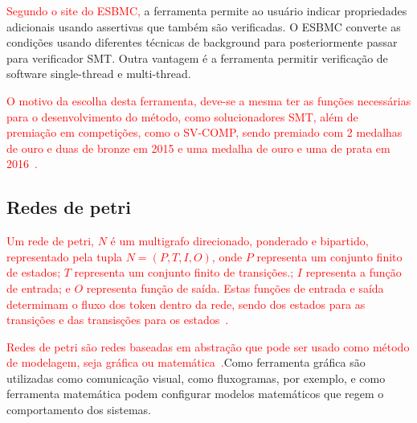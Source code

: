 \par
\textcolor{red}{Segundo o site do ESBMC\cite{esbmc},} a ferramenta permite ao usuário indicar propriedades adicionais usando assertivas que também são verificadas. O ESBMC converte as condições usando diferentes técnicas de background para posteriormente passar para verificador SMT. Outra vantagem é a ferramenta permitir verificação de software single-thread e multi-thread.


\par
\textcolor{red}{O motivo da escolha desta ferramenta, deve-se a mesma ter as funções necessárias para o desenvolvimento do método, como solucionadores SMT, além de premiação em competições, como o SV-COMP, sendo premiado com 2 medalhas de ouro e duas de bronze em 2015 e uma medalha de ouro e uma de prata em 2016~\cite{esbmc}.}

\subsection{Redes de petri}
\par
\textcolor{red}{Um rede de petri, $N$ é um multigrafo direcionado, ponderado e bipartido, representado pela tupla $N=(P,T,I,O)$, onde $P$ representa um conjunto finito de estados; $T$ representa um conjunto finito de transições.; $I$ representa a função de entrada; e $O$ representa função de saída. Estas funções de entrada e saída determimam o fluxo dos token dentro da rede, sendo dos estados para as transições e das transisções para os estados~\cite{halder2006}.}


\textcolor{red}{Redes de petri são redes baseadas em abstração que pode ser usado como método de modelagem, seja gráfica ou matemática~\cite{halder2006}.}Como ferramenta gráfica são utilizadas como comunicação visual, como fluxogramas, por exemplo, e como ferramenta matemática podem configurar modelos matemáticos que regem o comportamento dos sistemas\cite{murata1989petri}. 

